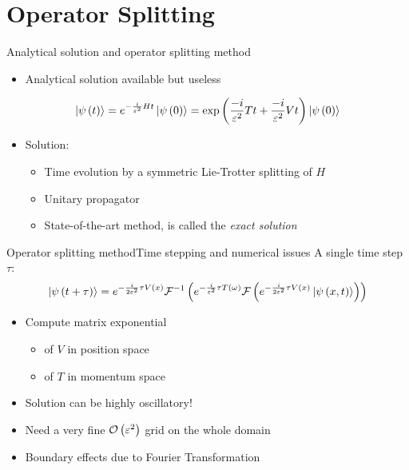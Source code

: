 \documentclass{beamer}
\begin{document}
\section{Operator Splitting}


\begin{frame}{Analytical solution and operator splitting method}
  \begin{itemize}
  \item Analytical solution available but useless
  \end{itemize}
  \begin{equation*} \label{eq:basics_analytic_time_propagation}
    \begin{split}
      \Ket{\psi\left( t \right)} & = e^{- \frac{i}{\varepsilon^2} H t } \Ket{\psi\left( 0 \right)} = \exp\left( \frac{-i}{\varepsilon^2}T t + \frac{-i}{\varepsilon^2}V t \right) \Ket{\psi\left( 0 \right)} \\
    \end{split}
  \end{equation*}
  \begin{itemize}
  \item Solution:
    \begin{itemize}
    \item Time evolution by a symmetric Lie-Trotter splitting of $H$
    \item Unitary propagator
    \item State-of-the-art method, is called the \emph{exact solution}
    \end{itemize}
  \end{itemize}
\end{frame}


\begin{frame}{Operator splitting method}{Time stepping and numerical issues}
  A single time step $\tau$:
  \begin{equation*}
    \Ket{\psi\left( t+\tau \right)} = e^{-\frac{i}{2\varepsilon^2} \tau V\left( x \right)} \mathcal{F}^{-1}\left(  e^{-\frac{i}{\varepsilon^2} \tau T\left( \omega \right)} \mathcal{F}\left( e^{-\frac{i}{2\varepsilon^2} \tau V\left( x \right)} \Ket{\psi\left( x,t \right)}\right)\right)
  \end{equation*}
  \begin{itemize}
  \item Compute matrix exponential
    \begin{itemize}
    \item of $V$ in position space
    \item of $T$ in momentum space
    \end{itemize}
  \end{itemize}
  \begin{itemize}
  \item Solution can be highly oscillatory!
  \item Need a very fine $\mathcal{O}\left( \varepsilon^2 \right)$ grid on the whole domain
  \item Boundary effects due to Fourier Transformation
  \end{itemize}
\end{frame}
\end{document}
